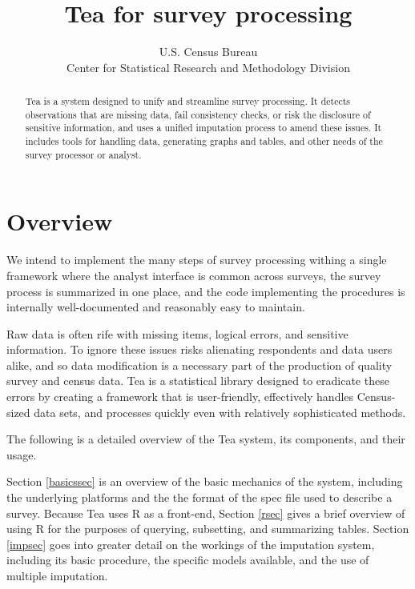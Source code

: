 \documentclass{article}
\begin{document}
\author{U.S. Census Bureau\\Center for Statistical Research and Methodology Division}
\title{Tea for survey processing}
\maketitle

\begin{abstract}
Tea is a system designed to unify and streamline survey processing.  It detects
observations that are missing data, fail consistency checks, or risk the disclosure
of sensitive information, and uses a unified imputation process to amend these issues.
It includes tools for handling data, generating graphs and tables, and other needs of
the survey processor or analyst.
\end{abstract}


\section{Overview}
{\sc We intend} to implement the many steps of survey processing withing a single
framework where the analyst interface is common across surveys, the survey process
is summarized in one place, and the code implementing the procedures is internally
well-documented and reasonably easy to maintain.

Raw data is often rife with missing items, logical errors, and sensitive information.
To ignore these issues risks alienating respondents and data users alike, and so data
modification is a necessary part of the production of quality survey and census data.
Tea is a statistical library designed to eradicate these errors by creating a framework
that is user-friendly, effectively handles Census-sized data sets, and processes
quickly even with relatively sophisticated methods.

The following is a detailed overview of the Tea system, its components, and their usage.

Section \ref{basicssec} is an overview of the basic mechanics of the system, including the
underlying platforms and the the format of the spec file used to describe a survey.
Because Tea uses R as a front-end, Section \ref{rsec} gives a brief overview of using R
for the purposes of querying, subsetting, and summarizing tables.
Section \ref{impsec} goes into greater detail on the workings of the imputation system,
including its basic procedure, the specific models available, and the use of multiple imputation.
\end{document}
